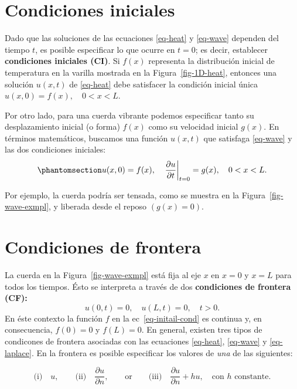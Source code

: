 \documentclass[
  spanish,
  us-letterpaper,
  DIV=11,
  numbers=noendperiod]{scrreprt}
\theoremstyle{plain}
\theoremstyle{definition}
\theoremstyle{remark}
\begin{document}
\section{Condiciones iniciales}\label{condiciones-iniciales}

Dado que las soluciones de las ecuaciones \ref{eq-heat} y \ref{eq-wave}
dependen del tiempo \(t\), es posible especificar lo que ocurre en
\(t = 0\); es decir, establecer \textbf{condiciones iniciales (CI)}. Si
\(f(x)\) representa la distribución inicial de temperatura en la varilla
mostrada en la Figura~\ref{fig-1D-heat}, entonces una solución
\(u(x, t)\) de \ref{eq-heat} debe satisfacer la condición inicial única
\(u(x, 0) = f(x), \quad 0 < x < L\).

Por otro lado, para una cuerda vibrante podemos especificar tanto su
desplazamiento inicial (o forma) \(f(x)\) como su velocidad inicial
\(g(x)\). En términos matemáticos, buscamos una función \(u(x, t)\) que
satisfaga \ref{eq-wave} y las dos condiciones iniciales:
\begin{equation}\phantomsection\label{eq-initail-cond}{
u(x, 0) = f(x), \quad \left. \frac{\partial u}{\partial t} \right|_{t=0} = g(x), \quad 0 < x < L.
}\end{equation}

Por ejemplo, la cuerda podría ser tensada, como se muestra en la
Figura~\ref{fig-wave-exmpl}, y liberada desde el reposo \((g(x)=0)\).

\section{Condiciones de frontera}\label{condiciones-de-frontera}

La cuerda en la Figura~\ref{fig-wave-exmpl} está fija al eje \(x\) en
\(x=0\) y \(x=L\) para todos los tiempos. Ésto se interpreta a través de
dos \textbf{condiciones de frontera (CF):} \[
u(0,t) = 0, \quad u(L,t)=0, \quad t>0.
\] En éste contexto la función \(f\) en la ec~\ref{eq-initail-cond} es
continua y, en consecuencia, \(f(0)=0\) y \(f(L)=0\). En general,
existen tres tipos de condicones de frontera asociadas con las
ecuaciones \ref{eq-heat}, \ref{eq-wave} y \ref{eq-laplace}. En la
frontera es posible especificar los valores de \emph{una} de las
siguientes:

\[
\text{(i)}\quad u, \qquad \text{(ii)}\quad \dfrac{\partial u}{\partial n},\qquad \text{or}\qquad \text{(iii)}\quad \dfrac{\partial u}{\partial n} + hu,\quad \text{con $h$ constante.}
\]
\end{document}
